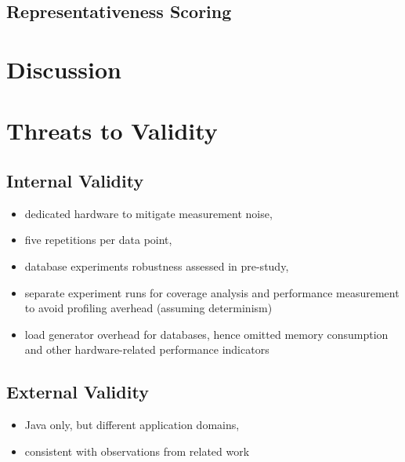 \subsection{Representativeness Scoring}

\section{Discussion}

\section{Threats to Validity}\label{sec:threats}
\subsection{Internal Validity}\label{sec:internal_validity}
\begin{itemize}
	\item dedicated hardware to mitigate measurement noise, 
	\item five repetitions per data point, 
	\item database experiments robustness assessed in pre-study,
	\item separate experiment runs for coverage analysis and performance measurement to avoid profiling averhead (assuming determinism)
	\item load generator overhead for databases, hence omitted memory consumption and other hardware-related performance indicators 
\end{itemize}

\subsection{External Validity}\label{sec:external_validity}
\begin{itemize}
	\item Java only, but different application domains,
	\item consistent with observations from related work
\end{itemize}

